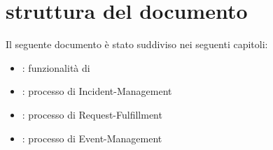 %
%
\section[Struttura del documento]{struttura del documento}
\label{abs-document-structure}
Il seguente documento è stato suddiviso nei seguenti capitoli:

\begin{itemize}
\item{: funzionalità di }
\item{: processo di \acf{Incident-Management}}
\item{: processo di \acf{Request-Fulfillment}}
\item{: processo di \acf{Event-Management}}
\end{itemize}